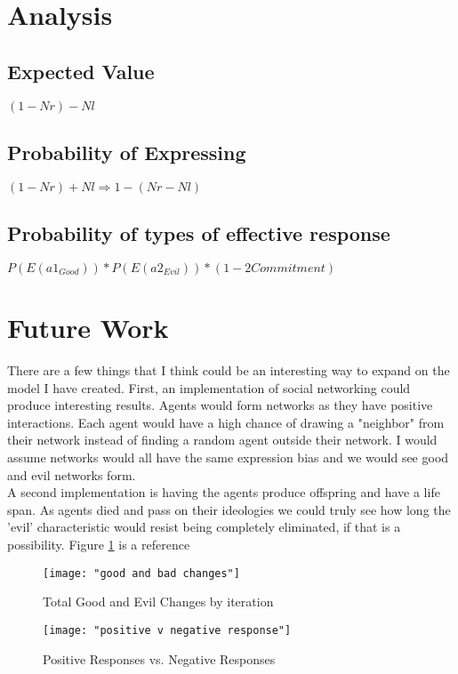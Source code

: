 \documentclass[]{article}
\begin{document}
\section{Analysis}
\subsection{Expected Value}
$(1-Nr) - Nl$
\subsection{Probability of Expressing}
$(1-Nr) + Nl \Rightarrow 1 - (Nr - Nl)$
\subsection{Probability of types of effective response}
$P(E(a1_{Good})) * P(E(a2_{Evil})) * (1 - 2Commitment)$

\section{Future Work}
There are a few things that I think could be an interesting way to expand on the model I have created. First, an implementation of social networking could produce interesting results. Agents would form networks as they have positive interactions. Each agent would have a high chance of drawing a "neighbor" from their network instead of finding a random agent outside their network. I would assume networks would all have the same expression bias and we would see good and evil networks form. \\
A second implementation is having the agents produce offspring and have a life span. As agents died and pass on their ideologies we could truly see how long the 'evil' characteristic would resist being completely eliminated, if that is a possibility.
Figure \ref{fig:good and bad changes} is a reference

\newpage

\begin{figure}
	\centering
	\texttt{[image: "good and bad changes"]}
	\caption{Total Good and Evil Changes by iteration}
	\label{fig:good and bad changes}
\end{figure}

\begin{figure}
	\centering
	\texttt{[image: "positive v negative response"]}
	\caption{Positive Responses vs. Negative Responses}
	\label{fig:positivevnegativeresponse}
\end{figure}
\end{document}
